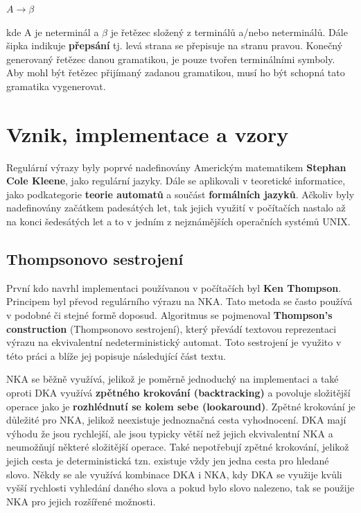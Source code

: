 $A \longrightarrow \beta$

\noindent 
kde A je neterminál a $\beta$ je řetězec složený z terminálů a/nebo neterminálů. 
Dále šipka indikuje \textbf{přepsání} tj. levá strana se přepisuje na stranu pravou.
Konečný generovaný řetězec danou gramatikou, je pouze tvořen terminálními symboly.
Aby mohl být řetězec přijímaný zadanou gramatikou, musí ho být schopná tato gramatika vygenerovat.

\section{Vznik, implementace a vzory}
Regulární výrazy byly poprvé nadefinovány Americkým matematikem \textbf{Stephan Cole Kleene}, jako regulární jazyky. 
Dále se aplikovali v teoretické informatice, jako podkategorie \textbf{teorie automatů} a součást \textbf{formálních jazyků}.
Ačkoliv byly nadefinovány začátkem padesátých let, tak jejich využití v počítačích nastalo až na konci šedesátých let a to v 
jedním z nejznámějších operačních systémů UNIX.

\subsection*{Thompsonovo sestrojení}

První kdo navrhl implementaci používanou v počítačích byl \textbf{Ken Thompson}.
Principem byl převod regulárního výrazu na NKA.
Tato metoda se často používá v podobné či stejné formě doposud.
Algoritmus se pojmenoval \textbf{Thompson's construction} (Thompsonovo sestrojení), který převádí textovou reprezentaci výrazu na ekvivalentní nedeterministický automat.
Toto sestrojení je využito v této práci a blíže jej popisuje následující část textu.

NKA se běžně využívá, jelikož je poměrně jednoduchý na implementaci a
také oproti DKA využívá \textbf{zpětného krokování (backtracking)} a povoluje složitější operace jako je \textbf{rozhlédnutí se kolem sebe (lookaround)}.
Zpětné krokování je důležité pro NKA, jelikož neexistuje jednoznačná cesta vyhodnocení.
DKA mají výhodu že jsou rychlejší, ale jsou typicky větší než jejich ekvivalentní NKA a neumožňují některé složitější operace.
Také nepotřebují zpětné krokování, jelikož jejich cesta je deterministická tzn. existuje vždy jen jedna cesta pro hledané slovo.
Někdy se ale využívá kombinace DKA i NKA, kdy DKA se využije kvůli vyšší rychlosti vyhledání daného slova a pokud bylo slovo nalezeno, 
tak se použije NKA pro jejich rozšířené možnosti.


